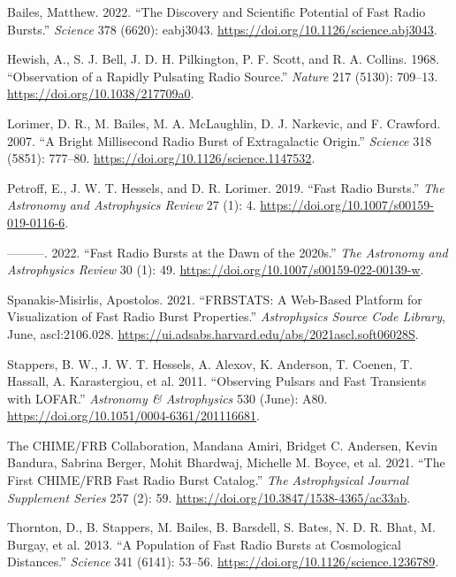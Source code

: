 \documentclass[english,singlespacedlisttitles]{umalayathesis}
\begin{document}

\hypertarget{refs}{}
\begin{CSLReferences}{1}{0}
\leavevmode{}%
Bailes, Matthew. 2022. {``The Discovery and Scientific Potential of Fast
Radio Bursts.''} \emph{Science} 378 (6620): eabj3043.
\url{https://doi.org/10.1126/science.abj3043}.

\leavevmode{}%
Hewish, A., S. J. Bell, J. D. H. Pilkington, P. F. Scott, and R. A.
Collins. 1968. {``Observation of a {Rapidly Pulsating Radio Source}.''}
\emph{Nature} 217 (5130): 709--13.
\url{https://doi.org/10.1038/217709a0}.

\leavevmode{}%
Lorimer, D. R., M. Bailes, M. A. McLaughlin, D. J. Narkevic, and F.
Crawford. 2007. {``A Bright Millisecond Radio Burst of Extragalactic
Origin.''} \emph{Science} 318 (5851): 777--80.
\url{https://doi.org/10.1126/science.1147532}.

\leavevmode{}%
Petroff, E., J. W. T. Hessels, and D. R. Lorimer. 2019. {``Fast Radio
Bursts.''} \emph{The Astronomy and Astrophysics Review} 27 (1): 4.
\url{https://doi.org/10.1007/s00159-019-0116-6}.

\leavevmode{}%
---------. 2022. {``Fast Radio Bursts at the Dawn of the 2020s.''}
\emph{The Astronomy and Astrophysics Review} 30 (1): 49.
\url{https://doi.org/10.1007/s00159-022-00139-w}.

\leavevmode{}%
Spanakis-Misirlis, Apostolos. 2021. {``{FRBSTATS}: {A} Web-Based
Platform for Visualization of Fast Radio Burst Properties.''}
\emph{Astrophysics Source Code Library}, June, ascl:2106.028.
\url{https://ui.adsabs.harvard.edu/abs/2021ascl.soft06028S}.

\leavevmode{}%
Stappers, B. W., J. W. T. Hessels, A. Alexov, K. Anderson, T. Coenen, T.
Hassall, A. Karastergiou, et al. 2011. {``Observing Pulsars and Fast
Transients with {LOFAR}.''} \emph{Astronomy \& Astrophysics} 530 (June):
A80. \url{https://doi.org/10.1051/0004-6361/201116681}.

\leavevmode{}%
The CHIME/FRB Collaboration, Mandana Amiri, Bridget C. Andersen, Kevin
Bandura, Sabrina Berger, Mohit Bhardwaj, Michelle M. Boyce, et al. 2021.
{``The {First CHIME}/{FRB Fast Radio Burst Catalog}.''} \emph{The
Astrophysical Journal Supplement Series} 257 (2): 59.
\url{https://doi.org/10.3847/1538-4365/ac33ab}.

\leavevmode{}%
Thornton, D., B. Stappers, M. Bailes, B. Barsdell, S. Bates, N. D. R.
Bhat, M. Burgay, et al. 2013. {``A {Population} of {Fast} {Radio}
{Bursts} at {Cosmological} {Distances}.''} \emph{Science} 341 (6141):
53--56. \url{https://doi.org/10.1126/science.1236789}.

\end{CSLReferences}
% 
% 

\printglossary
\end{document}
